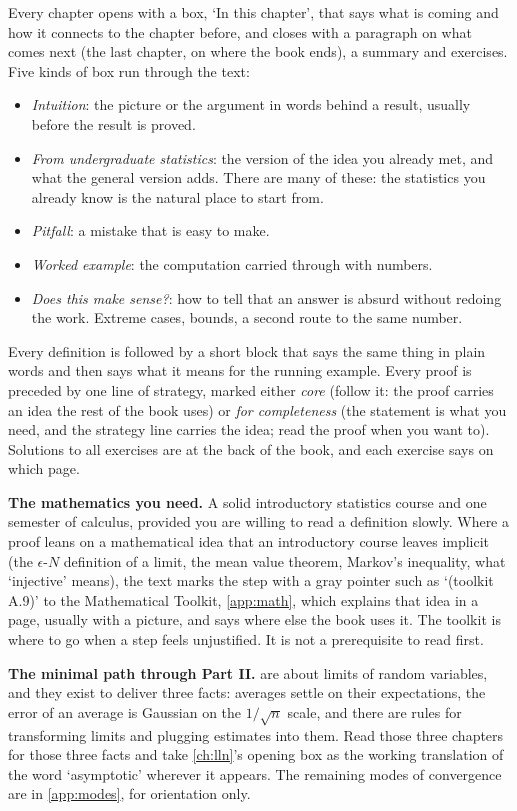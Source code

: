 Every chapter opens with a box, `In this chapter', that says what is coming and how it connects to the chapter before, and closes with a paragraph on what comes next (the last chapter, on where the book ends), a summary and exercises.
Five kinds of box run through the text:
\begin{itemize}[nosep]
\item \textit{Intuition}: the picture or the argument in words behind a result, usually before the result is proved.
\item \textit{From undergraduate statistics}: the version of the idea you already met, and what the general version adds. There are many of these: the statistics you already know is the natural place to start from.
\item \textit{Pitfall}: a mistake that is easy to make.
\item \textit{Worked example}: the computation carried through with numbers.
\item \textit{Does this make sense?}: how to tell that an answer is absurd without redoing the work. Extreme cases, bounds, a second route to the same number.
\end{itemize}
Every definition is followed by a short block that says the same thing in plain words and then says what it means for the running example.
Every proof is preceded by one line of strategy, marked either \textit{core} (follow it: the proof carries an idea the rest of the book uses) or \textit{for completeness} (the statement is what you need, and the strategy line carries the idea; read the proof when you want to).
Solutions to all exercises are at the back of the book, and each exercise says on which page.

\textbf{The mathematics you need.}
A solid introductory statistics course and one semester of calculus, provided you are willing to read a definition slowly.
Where a proof leans on a mathematical idea that an introductory course leaves implicit (the $\epsilon$-$N$ definition of a limit, the mean value theorem, Markov's inequality, what `injective' means), the text marks the step with a gray pointer such as `(toolkit A.9)' to the Mathematical Toolkit, \cref{app:math}, which explains that idea in a page, usually with a picture, and says where else the book uses it.
The toolkit is where to go when a step feels unjustified.
It is not a prerequisite to read first.

\textbf{The minimal path through Part II.}
 are about limits of random variables, and they exist to deliver three facts: averages settle on their expectations, the error of an average is Gaussian on the $1/\sqrt{n}$ scale, and there are rules for transforming limits and plugging estimates into them.
Read those three chapters for those three facts and take \cref{ch:lln}'s opening box as the working translation of the word `asymptotic' wherever it appears.
The remaining modes of convergence are in \cref{app:modes}, for orientation only.

